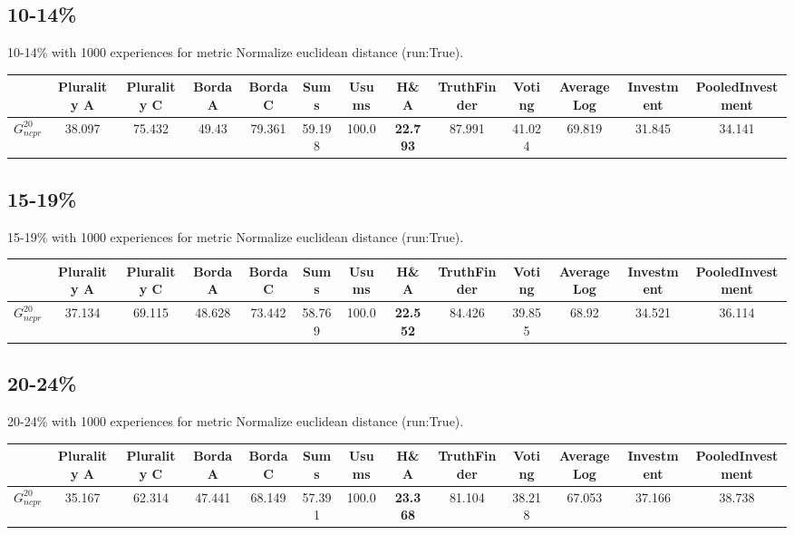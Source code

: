 \documentclass{article}
\newcommand{\graph}[2]{$G_{#1}^{#2}$}
\begin{document}
\newpage

\subsection{10-14\%}

10-14\% with 1000 experiences for metric Normalize euclidean distance (run:True).

\noindent\begin{tabular}{|l|c|c|c|c|c|c|c|c|c|c|c|c|}
\hline
& Plurality A& Plurality C& Borda A& Borda C& Sums& Usums& H\&A& TruthFinder& Voting& AverageLog& Investment& PooledInvestment\\
\hline
\graph{ncpr}{20} &38.097&75.432&49.43&79.361&59.198&100.0&\textbf{22.793}&87.991&41.024&69.819&31.845&34.141\\
\hline
\end{tabular}
\newpage

\subsection{15-19\%}

15-19\% with 1000 experiences for metric Normalize euclidean distance (run:True).

\noindent\begin{tabular}{|l|c|c|c|c|c|c|c|c|c|c|c|c|}
\hline
& Plurality A& Plurality C& Borda A& Borda C& Sums& Usums& H\&A& TruthFinder& Voting& AverageLog& Investment& PooledInvestment\\
\hline
\graph{ncpr}{20} &37.134&69.115&48.628&73.442&58.769&100.0&\textbf{22.552}&84.426&39.855&68.92&34.521&36.114\\
\hline
\end{tabular}
\newpage

\subsection{20-24\%}

20-24\% with 1000 experiences for metric Normalize euclidean distance (run:True).

\noindent\begin{tabular}{|l|c|c|c|c|c|c|c|c|c|c|c|c|}
\hline
& Plurality A& Plurality C& Borda A& Borda C& Sums& Usums& H\&A& TruthFinder& Voting& AverageLog& Investment& PooledInvestment\\
\hline
\graph{ncpr}{20} &35.167&62.314&47.441&68.149&57.391&100.0&\textbf{23.368}&81.104&38.218&67.053&37.166&38.738\\
\hline
\end{tabular}
\newpage
\end{document}
